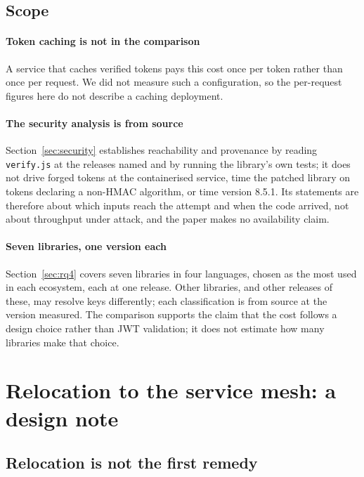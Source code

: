 \documentclass[preprint,12pt,authoryear]{elsarticle}
\begin{document}
\subsection{Scope}\label{sec:threats-scope}

\paragraph{Token caching is not in the comparison} A service that caches
verified tokens pays this cost once per token rather than once per request. We
did not measure such a configuration, so the per-request figures here do not
describe a caching deployment.

\paragraph{The security analysis is from source} Section~\ref{sec:security}
establishes reachability and provenance by reading \texttt{verify.js} at the
releases named and by running the library's own tests; it does not drive
forged tokens at the containerised service, time the patched library on tokens
declaring a non-HMAC algorithm, or time version 8.5.1. Its statements are
therefore about which inputs reach the attempt and when the code arrived, not
about throughput under attack, and the paper makes no availability claim.

\paragraph{Seven libraries, one version each} Section~\ref{sec:rq4} covers
seven libraries in four languages, chosen as the most used in each ecosystem,
each at one release. Other libraries, and other releases of these, may resolve
keys differently; each classification is from source at the version measured.
The comparison supports the claim that the cost follows a design choice rather
than JWT validation; it does not estimate how many libraries make that
choice.

\section{Relocation to the service mesh: a design note}


\subsection{Relocation is not the first remedy}\label{sec:offload}
\end{document}
